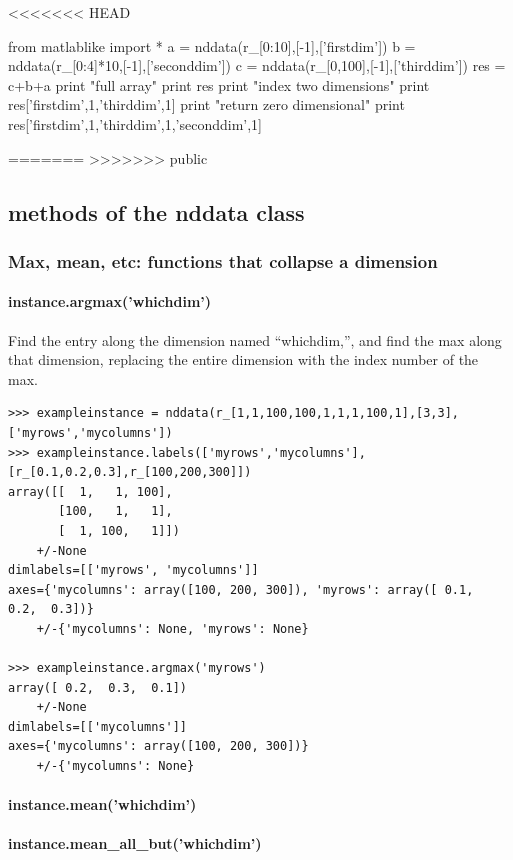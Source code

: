 <<<<<<< HEAD


\begin{python}
from matlablike import *
a = nddata(r_[0:10],[-1],['firstdim'])
b = nddata(r_[0:4]*10,[-1],['seconddim'])
c = nddata(r_[0,100],[-1],['thirddim'])
res = c+b+a
print "full array"
print res
print "index two dimensions"
print res['firstdim',1,'thirddim',1]
print "return zero dimensional"
print res['firstdim',1,'thirddim',1,'seconddim',1]
\end{python}
=======
>>>>>>> public
\subsection{methods of the nddata class}
\subsubsection{Max, mean, etc: functions that collapse a dimension}
\paragraph{instance.argmax('whichdim')}
Find the entry along the dimension named ``whichdim,'', and find the max along that dimension, replacing the entire dimension with the index number of the max.

\begin{lstlisting}
>>> exampleinstance = nddata(r_[1,1,100,100,1,1,1,100,1],[3,3],['myrows','mycolumns'])
>>> exampleinstance.labels(['myrows','mycolumns'],[r_[0.1,0.2,0.3],r_[100,200,300]])
array([[  1,   1, 100],
       [100,   1,   1],
       [  1, 100,   1]])
    +/-None
dimlabels=[['myrows', 'mycolumns']]
axes={'mycolumns': array([100, 200, 300]), 'myrows': array([ 0.1,  0.2,  0.3])}
    +/-{'mycolumns': None, 'myrows': None}

>>> exampleinstance.argmax('myrows')
array([ 0.2,  0.3,  0.1])
    +/-None
dimlabels=[['mycolumns']]
axes={'mycolumns': array([100, 200, 300])}
    +/-{'mycolumns': None}

\end{lstlisting}
\paragraph{instance.mean('whichdim')}
\paragraph{instance.mean\_all\_but('whichdim')}
